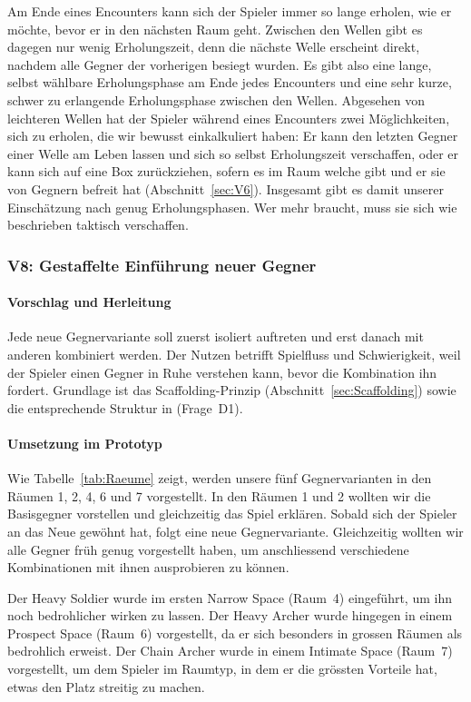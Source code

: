 \documentclass[../Main.tex]{subfiles}
\begin{document}
Am Ende eines Encounters kann sich der Spieler immer so lange erholen, wie er möchte, bevor er in den nächsten Raum geht. Zwischen den Wellen gibt es dagegen nur wenig Erholungszeit, denn die nächste Welle erscheint direkt, nachdem alle Gegner der vorherigen besiegt wurden. Es gibt also eine lange, selbst wählbare Erholungsphase am Ende jedes Encounters und eine sehr kurze, schwer zu erlangende Erholungsphase zwischen den Wellen. Abgesehen von leichteren Wellen hat der Spieler während eines Encounters zwei Möglichkeiten, sich zu erholen, die wir bewusst einkalkuliert haben: Er kann den letzten Gegner einer Welle am Leben lassen und sich so selbst Erholungszeit verschaffen, oder er kann sich auf eine Box zurückziehen, sofern es im Raum welche gibt und er sie von Gegnern befreit hat (Abschnitt~\ref{sec:V6}). Insgesamt gibt es damit unserer Einschätzung nach genug Erholungsphasen. Wer mehr braucht, muss sie sich wie beschrieben taktisch verschaffen.

\subsubsection{V8: Gestaffelte Einführung neuer Gegner} \label{sec:V8}

\paragraph{Vorschlag und Herleitung}
Jede neue Gegnervariante soll zuerst isoliert auftreten und erst danach mit anderen kombiniert werden. Der Nutzen betrifft Spielfluss und Schwierigkeit, weil der Spieler einen Gegner in Ruhe verstehen kann, bevor die Kombination ihn fordert. Grundlage ist das Scaffolding-Prinzip (Abschnitt~\ref{sec:Scaffolding}) sowie die entsprechende Struktur in  (Frage~D1).

\paragraph{Umsetzung im Prototyp}
Wie Tabelle~\ref{tab:Raeume} zeigt, werden unsere fünf Gegnervarianten in den Räumen 1, 2, 4, 6 und 7 vorgestellt. In den Räumen 1 und 2 wollten wir die Basisgegner vorstellen und gleichzeitig das Spiel erklären. Sobald sich der Spieler an das Neue gewöhnt hat, folgt eine neue Gegnervariante. Gleichzeitig wollten wir alle Gegner früh genug vorgestellt haben, um anschliessend verschiedene Kombinationen mit ihnen ausprobieren zu können.

Der Heavy Soldier wurde im ersten Narrow Space (Raum~4) eingeführt, um ihn noch bedrohlicher wirken zu lassen. Der Heavy Archer wurde hingegen in einem Prospect Space (Raum~6) vorgestellt, da er sich besonders in grossen Räumen als bedrohlich erweist. Der Chain Archer wurde in einem Intimate Space (Raum~7) vorgestellt, um dem Spieler im Raumtyp, in dem er die grössten Vorteile hat, etwas den Platz streitig zu machen.
\end{document}
